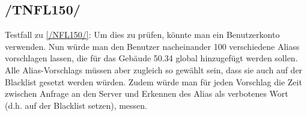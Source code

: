 \subsection*{/TNFL150/}
\label{/TNFL150/} Testfall zu \ref{/NFL150/}: Um dies zu prüfen, könnte man ein \Gls{Benutzer}konto verwenden. Nun würde man den \Gls{Benutzer} nacheinander 100 verschiedene \Glspl{Alias} vorschlagen lassen, die für das Gebäude 50.34 \gls{global} hinzugefügt werden sollen. Alle \Glspl{Alias-Vorschlag} müssen aber zugleich so gewählt sein, dass sie auch auf der \Gls{Blacklist} gesetzt werden würden. Zudem würde man für jeden Vorschlag die Zeit zwischen Anfrage an den \Gls{Server} und Erkennen des \Gls{Alias} als verbotenes Wort (d.h. auf der \Gls{Blacklist} setzen), messen.